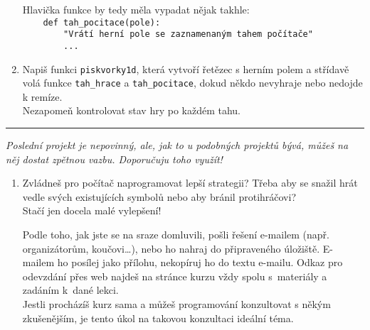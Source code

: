 \documentclass[a4paper,10pt]{article}
\newcommand\startsection[1]{
     \vspace{0.2ex}
    \hrule
    {\fontspec{Oxygen} \tiny
     \vspace{-1ex}
     \emph{#1}
     \vspace{-1.5em}
    }
}
\begin{document}
\begin{enumerate}[resume]
    Hlavička funkce by tedy měla vypadat nějak takhle:
\\\verb+    def tah_pocitace(pole):+
\\\verb+        "Vrátí herní pole se zaznamenaným tahem počítače"+
\\\verb+        ...+

\item Napiš funkci \texttt{piskvorky1d}, která vytvoří řetězec s herním polem
    a střídavě volá funkce \texttt{tah\_hrace} a \texttt{tah\_pocitace},
    dokud někdo nevyhraje nebo nedojde k remíze.
    \\Nezapomeň kontrolovat stav hry po každém tahu.

\end{enumerate}

\startsection{Poslední projekt je nepovinný, ale, jak to u podobných projektů bývá, můžeš na něj dostat zpětnou vazbu. Doporučuju toho využít!}

\begin{enumerate}[resume]

\item Zvládneš pro počítač naprogramovat lepší strategii?
    Třeba aby se snažil hrát vedle svých existujících symbolů
    nebo aby bránil protihráčovi?
    \\Stačí jen docela malé vylepšení!

    Podle toho, jak jste se na sraze domluvili, pošli řešení e-mailem
    (např. organizátorům, koučovi…), nebo ho nahraj do připraveného úložiště.
    E-mailem ho posílej jako přílohu, nekopíruj ho do textu e-mailu.
    Odkaz pro odevzdání přes web najdeš na stránce kurzu vždy spolu s~materiály
    a zadáním k~dané lekci.
    \\Jestli procházíš kurz sama a můžeš programování konzultovat s někým
    zkušenějším, je tento úkol na takovou konzultaci ideální téma.

\end{enumerate}
\end{document}
